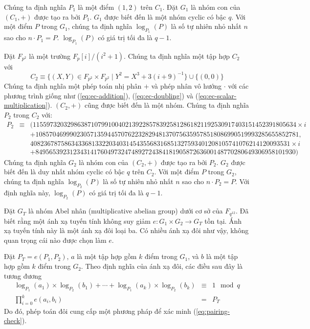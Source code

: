 \documentclass[9pt,oneside]{amsart}
\begin{document}
Chúng ta định nghĩa $P_1$ là một điểm $(1,2)$ trên $C_1$. Đặt $G_1$ là nhóm con của $(C_1,+)$ được tạo ra bởi $P_1$. $G_1$ được biết đến là một nhóm cyclic có bậc $q$. Với một điểm $P$ trong $G_1$, chúng ta định nghĩa $\log_{P_1}(P)$ là số tự nhiên nhỏ nhất $n$ sao cho $n\cdot P_1=P$. $\log_{P_1}(P)$ có giá trị tối đa là $q-1$.

Đặt $F_{p^2}$ là một trường $F_{p}[i]/(i^2+1)$. Chúng ta định nghĩa một tập hợp $C_2$ với
\begin{equation}
C_2\equiv\{(X,Y)\in F_{p^2}\times F_{p^2}\mid Y^2=X^3+3(i+9)^{-1}\}\cup\{(0,0)\}
\end{equation}
Chúng ta định nghĩa một phép toán nhị phân $+$ và phép nhân vô hướng $\cdot$ với các phương trình giống như (\ref{eq:ec-addition}), (\ref{eq:ec-doubling}) và (\ref{eq:ec-scalar-multiplication}). $(C_2,+)$ cũng được biết đến là một nhóm. Chúng ta định nghĩa $P_2$ trong $C_2$ với:
\begin{eqnarray}
P_2&\equiv&
(11559732032986387107991004021392285783925812861821192530917403151452391805634 \times i\\\nonumber &&+ 10857046999023057135944570762232829481370756359578518086990519993285655852781,\\\nonumber && 4082367875863433681332203403145435568316851327593401208105741076214120093531 \times i\\\nonumber &&+ 8495653923123431417604973247489272438418190587263600148770280649306958101930)
\end{eqnarray}
Chúng ta định nghĩa $G_2$ là nhóm con của $(C_2,+)$ được tạo ra bởi $P_2$. $G_2$ được biết đến là duy nhất nhóm cyclic có bậc $q$ trên $C_2$. Với một điểm $P$ trong $G_2$, chúng ta định nghĩa $\log_{P_2}(P)$ là số tự nhiên nhỏ nhất $n$ sao cho $n\cdot P_2=P$. Với định nghĩa này, $\log_{P_2}(P)$ có giá trị tối đa là $q-1$.

Đặt $G_T$ là nhóm Abel nhân (multiplicative abelian group) dưới cơ sở của $F_{q^{12}}$. Đã biết rằng một ánh xạ tuyến tính không suy giảm $e : G_1\times G_2 \to G_T$ tồn tại. Ánh xạ tuyến tính này là một ánh xạ đôi loại ba. Có nhiều ánh xạ đôi như vậy, không quan trọng cái nào được chọn làm $e$.

Đặt $P_T = e(P_1, P_2)$, $a$ là một tập hợp gồm $k$ điểm trong $G_1$, và $b$ là một tập hợp gồm $k$ điểm trong $G_2$. Theo định nghĩa của ánh xạ đôi, các điều sau đây là tương đương
\begin{eqnarray} \label{eq:pairing-check}
\log_{P_1}(a_1)\times\log_{P_2}(b_1)+\cdots+\log_{P_1}(a_{k})\times\log_{P_2}(b_{k})&\equiv& 1\mod q\\
\prod_{i=0}^{k}e\left(a_i, b_i\right) &=& P_T
\end{eqnarray}
Do đó, phép toán đôi cung cấp một phương pháp để xác minh (\ref{eq:pairing-check}).
\end{document}
